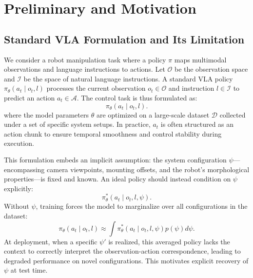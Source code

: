 \documentclass{llmxive}
\begin{document}



\section{Preliminary and Motivation}
\label{sec:analysis}

\subsection{Standard VLA Formulation and Its Limitation}


We consider a robot manipulation task where a policy $\pi$ maps multimodal observations and language instructions to actions. Let $\mathcal{O}$ be the observation space and $\mathcal{I}$ be the space of natural language instructions. A standard VLA policy $\pi_\theta\left(a_t \mid o_t, l\right)$ processes the current observation $o_t \in \mathcal{O}$ and instruction $l \in \mathcal{I}$ to predict an action $a_t \in \mathcal{A}$. The control task is thus formulated as:
\begin{equation}
\pi_\theta\left(a_t \mid o_t, l\right).
\end{equation}
where the model parameters $\theta$ are optimized on a large-scale dataset $\mathcal{D}$ collected under a set of specific system setups. In practice, $a_t$ is often structured as an action chunk to ensure temporal smoothness and control stability during execution.


This formulation embeds an implicit assumption: the system configuration 
$\psi$—encompassing camera viewpoints, mounting offsets, and the robot's 
morphological properties—is fixed and known. An ideal policy should instead 
condition on $\psi$ explicitly:
\begin{equation}
\pi_\theta^*\left(a_t \mid o_t, l, \psi\right).
\end{equation}
Without $\psi$, training forces the model to marginalize over all 
configurations in the dataset:
\begin{equation}
\pi_\theta\left(a_t \mid o_t, l\right) \approx \int \pi_\theta^*\left(a_t \mid o_t, l, \psi\right) 
p\left(\psi\right) d\psi.
\end{equation}
At deployment, when a specific $\psi'$ is realized, this averaged policy 
lacks the context to correctly interpret the observation-action correspondence, 
leading to degraded performance on novel configurations. This motivates 
explicit recovery of $\psi$ at test time.
\end{document}
